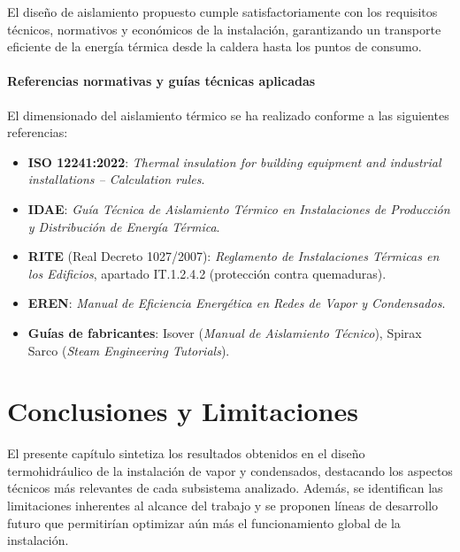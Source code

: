 El diseño de aislamiento propuesto cumple satisfactoriamente con los requisitos técnicos, normativos y económicos de la instalación, garantizando un transporte eficiente de la energía térmica desde la caldera hasta los puntos de consumo.

\paragraph{Referencias normativas y guías técnicas aplicadas}
\label{par:referencias_aislamiento}

El dimensionado del aislamiento térmico se ha realizado conforme a las siguientes referencias:

\begin{itemize}[noitemsep]
	\item \textbf{ISO 12241:2022}: \textit{Thermal insulation for building equipment and industrial installations -- Calculation rules}.
	\item \textbf{IDAE}: \textit{Guía Técnica de Aislamiento Térmico en Instalaciones de Producción y Distribución de Energía Térmica}.
	\item \textbf{RITE} (Real Decreto 1027/2007): \textit{Reglamento de Instalaciones Térmicas en los Edificios}, apartado IT.1.2.4.2 (protección contra quemaduras).
	\item \textbf{EREN}: \textit{Manual de Eficiencia Energética en Redes de Vapor y Condensados}.
	\item \textbf{Guías de fabricantes}: Isover (\textit{Manual de Aislamiento Técnico}), Spirax Sarco (\textit{Steam Engineering Tutorials}).
\end{itemize}


\section{Conclusiones y Limitaciones}
\label{sec:conclusiones}

El presente capítulo sintetiza los resultados obtenidos en el diseño termohidráulico de la instalación de vapor y condensados, destacando los aspectos técnicos más relevantes de cada subsistema analizado. Además, se identifican las limitaciones inherentes al alcance del trabajo y se proponen líneas de desarrollo futuro que permitirían optimizar aún más el funcionamiento global de la instalación.

